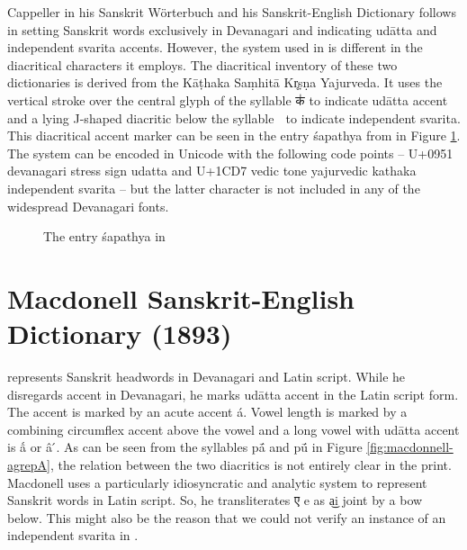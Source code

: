 Cappeller in his Sanskrit Wörterbuch \citep{ccs} and his Sanskrit-English Dictionary \citep{cae} follows \citet{pwg} in setting Sanskrit words exclusively in Devanagari and indicating udātta and independent svarita accents. However, the system used in \citet{ccs,cae} is different in the diacritical characters it employs. The diacritical inventory of these two dictionaries is derived from the Kāṭhaka Saṃhitā Kr̥ṣṇa Yajurveda. It uses the vertical stroke over the central glyph of the syllable {\devfont क॑} to indicate udātta accent and a lying J-shaped diacritic below the syllable {\devfont क᳗} to indicate independent svarita. This diacritical accent marker can be seen in the entry śapathya from \citet{cae} in Figure \ref{fig:Capeller-SapaTya}. The system can be encoded in Unicode with the following code points – U+0951 {\sc devanagari stress sign udatta} and U+1CD7 {\sc vedic tone yajurvedic kathaka independent svarita} – but the latter character is not included in any of the widespread Devanagari fonts. 

\begin{figure}[!ht]
\begin{center}
\end{center}
\caption[The entry śapathya in \citet{cae}]{\label{fig:Capeller-SapaTya}The entry śapathya in \citet{cae}}
\end{figure}

\section{Macdonell Sanskrit-English Dictionary (1893)}

\citet{md} represents Sanskrit headwords in Devanagari and Latin script. While he disregards accent in Devanagari, he marks udātta accent in the Latin script form. The accent is marked by an acute accent á. Vowel length is marked by a combining circumflex accent above the vowel and a long vowel with udātta accent is ấ or â ́. As can be seen from the syllables pā́ and pū́ in Figure \ref{fig:macdonnell-agrepA}, the relation between the two diacritics is not entirely clear in the print. Macdonell uses a particularly idiosyncratic and analytic system to represent Sanskrit words in Latin script. So, he transliterates {\devfont ए} e as a͜i joint by a bow below. This might also be the reason that we could not verify an instance of an independent svarita in \citet{md}.


